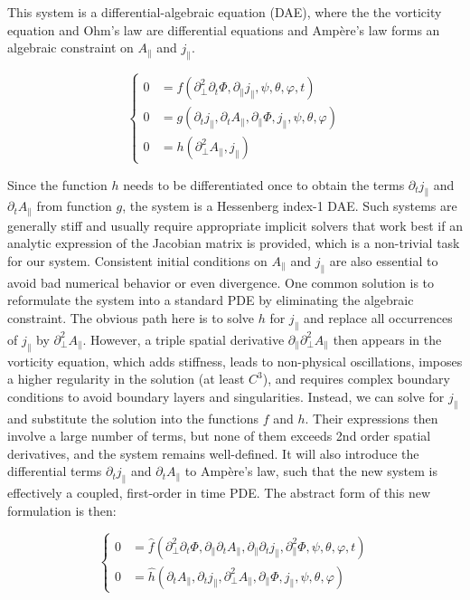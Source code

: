 This system is a differential-algebraic equation (DAE), where the the vorticity equation and Ohm's law are differential equations and Ampère's law forms an algebraic constraint on $A_\parallel$ and $j_\parallel$. 

\begin{equation}
	\left\{\begin{aligned}
		0 &= f(\partial^2_\perp \partial_t\Phi,\partial_\parallel j_\parallel,\psi,\theta,\varphi,t)\\
		0 &= g(\partial_t j_\parallel,\partial_t A_\parallel,\partial_\parallel \Phi,j_\parallel,\psi,\theta,\varphi)\\
		0 &= h(\partial^2_\perp A_\parallel,j_\parallel)
	\end{aligned}\right.
\end{equation}

Since the function $h$ needs to be differentiated once to obtain the terms $\partial_t j_\parallel$ and $\partial_t A_\parallel$ from function $g$, the system is a Hessenberg index-1 DAE. Such systems are generally stiff and usually require appropriate implicit solvers that work best if an analytic expression of the Jacobian matrix is provided, which is a non-trivial task for our system. Consistent initial conditions on $A_\parallel$ and $j_\parallel$ are also essential to avoid bad numerical behavior or even divergence. One common solution is to reformulate the system into a standard PDE by eliminating the algebraic constraint. The obvious path here is to solve $h$ for $j_\parallel$ and replace all occurrences of $j_\parallel$ by $\partial_\perp^2 A_\parallel$. However, a triple spatial derivative $\partial_\parallel\partial_\perp^2 A_\parallel$ then appears in the vorticity equation, which adds stiffness, leads to non-physical oscillations, imposes a higher regularity in the solution (at least $C^3$), and requires complex boundary conditions to avoid boundary layers and singularities. Instead, we can solve for $j_\parallel$ and substitute the solution into the functions $f$ and $h$. Their expressions then involve a large number of terms, but none of them exceeds 2nd order spatial derivatives, and the system remains well-defined. It will also introduce the differential terms $\partial_t j_\parallel$ and $\partial_t A_\parallel$ to Ampère's law, such that the new system is effectively a coupled, first-order in time PDE. The abstract form of this new formulation is then:

\begin{equation}
	\left\{\begin{aligned}
		0 &= \hat{f}(\partial^2_\perp \partial_t\Phi,\partial_\parallel \partial_t A_\parallel,\partial_\parallel \partial_t j_\parallel,\partial_\parallel^2 \Phi,\psi,\theta,\varphi,t)\\
		0 &= \hat{h}(\partial_t A_\parallel,\partial_t j_\parallel,\partial^2_\perp A_\parallel,\partial_\parallel \Phi,j_\parallel,\psi,\theta,\varphi)
	\end{aligned}\right.
\end{equation}


